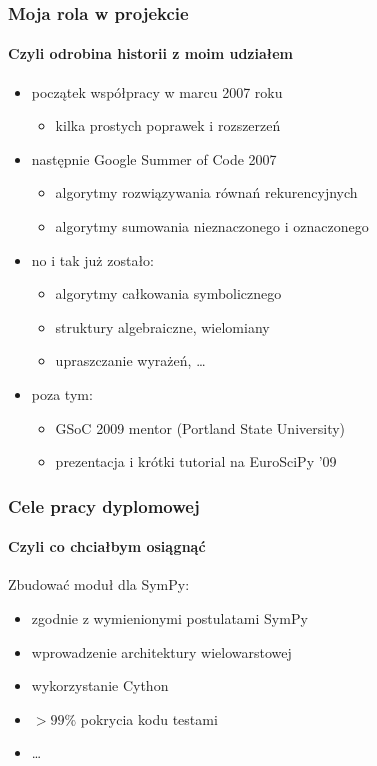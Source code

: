 \documentclass{beamer}
\begin{document}
\begin{frame}
    \frametitle{Moja rola w projekcie}
    \framesubtitle{Czyli odrobina historii z moim udziałem}

    \begin{itemize}
        \item początek współpracy w marcu 2007 roku
            \begin{itemize}
                \item kilka prostych poprawek i rozszerzeń
            \end{itemize}
            \pause
        \item następnie Google Summer of Code 2007
            \begin{itemize}
                \item algorytmy rozwiązywania równań rekurencyjnych
                \item algorytmy sumowania nieznaczonego i oznaczonego
            \end{itemize}
            \pause
        \item no i tak już zostało:
            \begin{itemize}
                \item algorytmy całkowania symbolicznego
                \item struktury algebraiczne, wielomiany
                \item upraszczanie wyrażeń, \ldots
            \end{itemize}
            \pause
        \item poza tym:
            \begin{itemize}
                \item GSoC 2009 mentor (Portland State University)
                \item prezentacja i krótki tutorial na EuroSciPy '09
            \end{itemize}
    \end{itemize}
\end{frame}

\begin{frame}
    \frametitle{Cele pracy dyplomowej}
    \framesubtitle{Czyli co chciałbym osiągnąć}

    Zbudować moduł  dla SymPy:
    \begin{itemize}
        \item zgodnie z wymienionymi postulatami SymPy
        \pause
        \item wprowadzenie architektury wielowarstowej
        \pause
        \item wykorzystanie  Cython
        \pause
        \item $>99\%$ pokrycia kodu testami
        \pause
        \item \ldots
    \end{itemize}
\end{frame}
\end{document}
